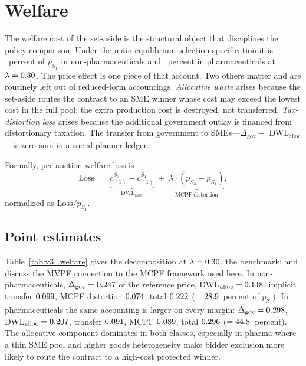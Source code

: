 \section{Welfare}\label{sec:welfare}

The welfare cost of the set-aside is the structural object that disciplines the policy comparison. Under the main equilibrium-selection specification it is \welfLossPctLthirtyNp~percent of $p_{S_1}$ in non-pharmaceuticals and \welfLossPctLthirtyPh~percent in pharmaceuticals at $\lambda = 0.30$. The price effect is one piece of that account. Two others matter and are routinely left out of reduced-form accountings. \emph{Allocative waste} arises because the set-aside routes the contract to an SME winner whose cost may exceed the lowest cost in the full pool; the extra production cost is destroyed, not transferred. \emph{Tax-distortion loss} arises because the additional government outlay is financed from distortionary taxation. The transfer from government to SMEs---$\Delta_{\text{gov}} - $ DWL$_{\text{alloc}}$---is zero-sum in a social-planner ledger.

Formally, per-auction welfare loss is
\begin{equation}\label{eq:welfare}
\mathrm{Loss} \;=\; \underbrace{c_{(1)}^{S_3} - c_{(1)}^{S_1}}_{\mathrm{DWL}_{\text{alloc}}}
\;+\; \underbrace{\lambda \cdot (p_{S_3} - p_{S_1})}_{\mathrm{MCPF\ distortion}},
\end{equation}
normalized as $\mathrm{Loss} / p_{S_1}$.

\subsection{Point estimates}

Table~\ref{tab:v3_welfare} gives the decomposition at $\lambda = 0.30$, the \citet{ballard1985} benchmark; \citet{hendren2020} and \citet{finkelstein2020} discuss the MVPF connection to the MCPF framework used here. In non-pharmaceuticals, $\Delta_{\text{gov}} = 0.247$ of the reference price, DWL$_{\text{alloc}} = 0.148$, implicit transfer $0.099$, MCPF distortion $0.074$, total $0.222$ ($= 28.9$~percent of $p_{S_1}$). In pharmaceuticals the same accounting is larger on every margin: $\Delta_{\text{gov}} = 0.298$, DWL$_{\text{alloc}} = 0.207$, transfer $0.091$, MCPF $0.089$, total $0.296$ ($= 44.8$~percent). The allocative component dominates in both classes, especially in pharma where a thin SME pool and higher goods heterogeneity make bidder exclusion more likely to route the contract to a high-cost protected winner.


